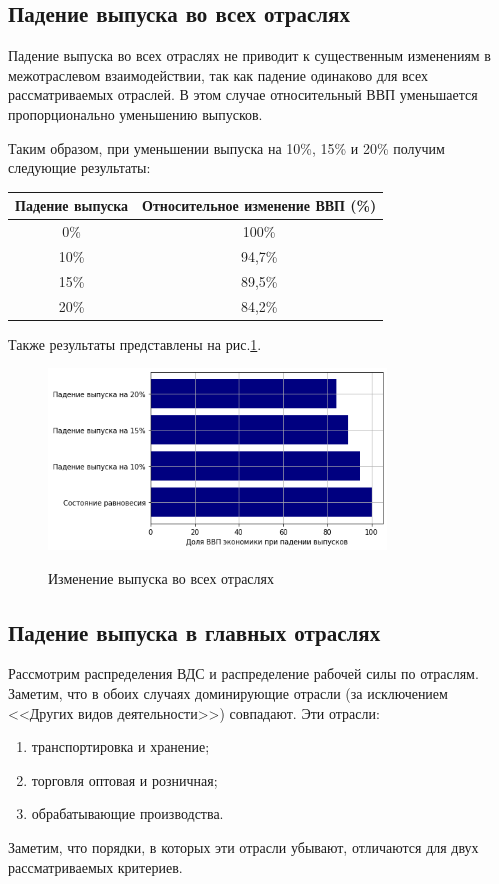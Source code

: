 \documentclass[12pt, a4paper]{article}
\begin{document}
\subsection{Падение выпуска во всех отраслях}

Падение выпуска во всех отраслях не приводит к существенным изменениям в межотраслевом взаимодействии, так как падение одинаково для всех рассматриваемых отраслей. В этом случае относительный ВВП уменьшается пропорционально уменьшению выпусков.

Таким образом, при уменьшении выпуска на 10\%, 15\% и 20\% получим следующие результаты:
\begin{center}
\begin{tabular}{|c|c|}
\hline
Падение выпуска & Относительное изменение ВВП (\%) \\
\hline
0\% & 100\% \\
10\% &94,7\% \\
15\% & 89,5\% \\
20\% & 84,2\%\\
\hline
\end{tabular}
\end{center}

Также результаты представлены на рис.\ref{fig1}.

\begin{figure}[h]
\includegraphics[width=0.8\textwidth]{pictures/shock1.png}\label{fig1}
\caption{Изменение выпуска во всех отраслях}
\end{figure}
\subsection{Падение выпуска в главных отраслях}

Рассмотрим распределения ВДС и распределение рабочей силы по отраслям. Заметим, что в обоих случаях доминирующие отрасли (за исключением <<Других видов деятельности>>) совпадают. Эти отрасли:
\begin{enumerate}
\item транспортировка и хранение;
\item торговля оптовая и розничная;
\item обрабатывающие производства.
\end{enumerate}
Заметим, что порядки, в которых эти отрасли убывают, отличаются для двух рассматриваемых критериев. 
\end{document}
